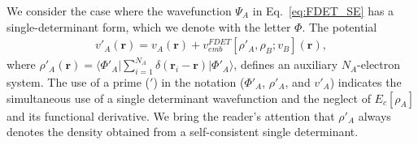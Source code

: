 \documentclass[amsmath,amssymb,preprint,aip,jcp]{revtex4-1}
\newcommand{\nr}[1]{\color{red}#1\color{black}}
\begin{document}
\nr{We consider the case where the wavefunction $\Psi_A$ in Eq.~\ref{eq:FDET_SE} has a single-determinant form, which we denote with the letter $\Phi$. 
The potential
\begin{eqnarray}
v'_A(\mathbf{r})=v_A(\mathbf{r})+v_{emb}^{{FDET}}[\rho'_A,\rho_B; v_B](\mathbf{r})\label{eq:def_v'},
\end{eqnarray}
where $\rho'_A(\mathbf{r})=\langle\Phi'_A\vert\sum_{i=1}^{N_{A}}\delta(\mathbf{r}_i-\mathbf{r})\vert\Phi'_A\rangle$, defines an auxiliary $N_A$-electron system. The use of a prime ($'$) in the notation ($\Phi'_A$, $\rho'_A$, and $v'_A$) indicates the simultaneous use of a single determinant wavefunction and the neglect of $E_c[\rho_A]$ and its functional derivative. We bring the reader's attention that $\rho'_A$ always denotes the density obtained from a self-consistent single determinant.}
\end{document}
